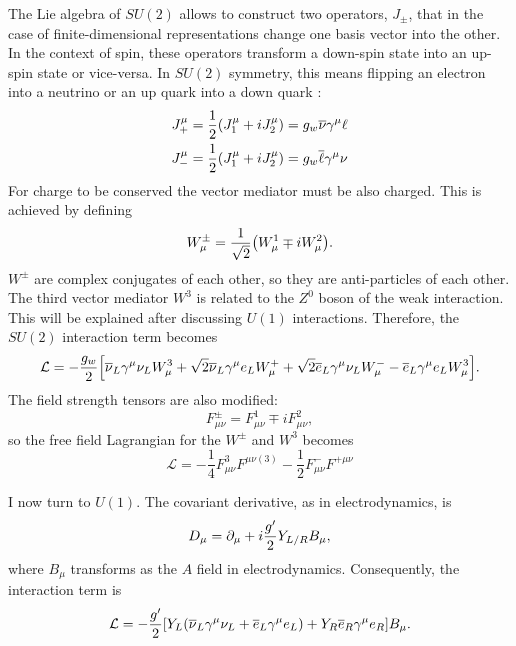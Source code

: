 The Lie algebra of $SU(2)$ allows to construct two operators, $J_{\pm}$, that in the case of finite-dimensional representations change one basis vector into the other. In the context of spin, these operators transform a down-spin state into an up-spin state or vice-versa. In $SU(2)$ symmetry, this means flipping an electron into a neutrino or an up quark into a down quark \cite{goldberg_standard_2017}:
\begin{align}
    J^\mu_{+} &= \frac{1}{2}\qty(J^\mu_{1}+iJ^{\mu}_{2}) = g_w\overline{\nu}\gamma^{\mu} \ell \\
    J^\mu_{-} &= \frac{1}{2}\qty(J^\mu_{1}+iJ^{\mu}_{2}) = g_w\overline{\ell}\gamma^{\mu} \nu
\end{align}
For charge to be conserved the vector mediator must be also charged. This is achieved by defining
\begin{equation}
    W^{\pm}_\mu = \frac{1}{\sqrt{2}}\qty(W_{\mu}^{1}\mp i W_{\mu}^{2}).
\end{equation}
$W^{\pm}$ are complex conjugates of each other, so they are anti-particles of each other. The third vector mediator $W^3$ is related to the $Z^0$ boson of the weak interaction. This will be explained after discussing $U(1)$ interactions. Therefore, the $SU(2)$ interaction term becomes
\begin{equation}
    \mathcal{L} = -\frac{g_w}{2}\qty[\overline{\nu}_L\gamma^\mu \nu_LW_{\mu}^{3}+\sqrt{2}\overline{\nu}_L\gamma^\mu e_LW_{\mu}^{+}+\sqrt{2}\overline{e}_L\gamma^{\mu}\nu_L W_{\mu}^{-}-\overline{e}_L\gamma^\mu e_L W_{\mu}^{3}].
\end{equation}
The field strength tensors are also modified:
\begin{equation}
    F_{\mu\nu}^{\pm} = F_{\mu\nu}^{1}\mp i F_{\mu\nu}^{2},
\end{equation}
so the free field Lagrangian for the $W^{\pm}$ and $W^{3}$ becomes
\begin{equation}\label{eq:weak-field-lag}
    \mathcal{L} = -\frac{1}{4}F_{\mu\nu}^{3}F^{\mu\nu(3)}-\frac{1}{2}F_{\mu\nu}^{-}F^{+\mu\nu}
\end{equation}

I now turn to $U(1)$. The covariant derivative, as in electrodynamics, is
\begin{equation}
    D_\mu = \partial_{\mu} +i\frac{g'}{2}Y_{L/R} B_\mu,
\end{equation}
where $B_\mu$ transforms as the $A$ field in electrodynamics. Consequently, the interaction term is
\begin{equation}
    \mathcal{L} = -\frac{g'}{2}\qty[Y_{L}\qty(\overline{\nu}_L\gamma^\mu \nu_L+\overline{e}_L\gamma^\mu e_L)+Y_R\overline{e}_R\gamma^\mu e_R]B_\mu.
\end{equation}

